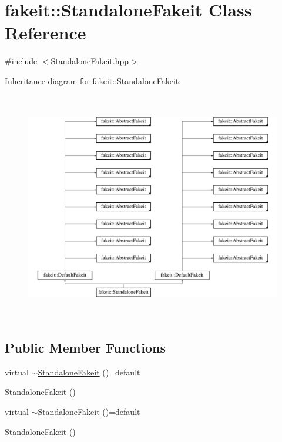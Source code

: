 \hypertarget{classfakeit_1_1StandaloneFakeit}{}\section{fakeit\+::Standalone\+Fakeit Class Reference}
\label{classfakeit_1_1StandaloneFakeit}


{\ttfamily \#include $<$Standalone\+Fakeit.\+hpp$>$}

Inheritance diagram for fakeit\+::Standalone\+Fakeit\+:\begin{figure}[H]
\begin{center}
\leavevmode
\includegraphics[height=10.065359cm]{classfakeit_1_1StandaloneFakeit}
\end{center}
\end{figure}
\subsection*{Public Member Functions}
\begin{DoxyCompactItemize}
\item 
virtual \mbox{\hyperlink{classfakeit_1_1StandaloneFakeit_a898209586fd0a76a61eb20c0e178a2cd}{$\sim$\+Standalone\+Fakeit}} ()=default
\item 
\mbox{\hyperlink{classfakeit_1_1StandaloneFakeit_ae864c0934e859cf666a6a5db84d39529}{Standalone\+Fakeit}} ()
\item 
virtual \mbox{\hyperlink{classfakeit_1_1StandaloneFakeit_a898209586fd0a76a61eb20c0e178a2cd}{$\sim$\+Standalone\+Fakeit}} ()=default
\item 
\mbox{\hyperlink{classfakeit_1_1StandaloneFakeit_ae864c0934e859cf666a6a5db84d39529}{Standalone\+Fakeit}} ()
\end{DoxyCompactItemize}
